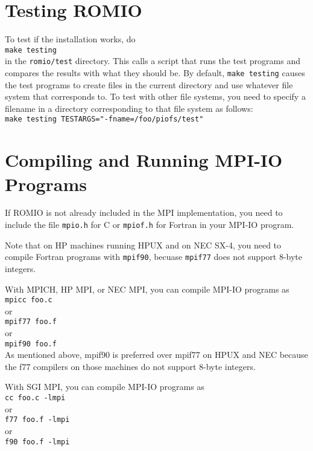 \section{Testing ROMIO}
To test if the installation works, do\\
\hspace*{.4in} {\tt make testing}\\
in the {\tt romio/test} directory. This calls a script that runs the test
programs and compares the results with what they should be. By
default, {\tt make testing} causes the test programs to create files in
the current directory and use whatever file system that corresponds
to. To test with other file systems, you need to specify a filename in
a directory corresponding to that file system as follows:\\
\hspace*{.4in} {\tt make testing TESTARGS="-fname=/foo/piofs/test"}


%
%
\section{Compiling and Running MPI-IO Programs}
If ROMIO is not already included in the MPI implementation, you need
to include the file {\tt mpio.h} for C or {\tt mpiof.h} for Fortran in
your MPI-IO program.  

Note that on HP machines running HPUX and on NEC SX-4, you need to
compile Fortran programs with {\tt mpif90}, becuase {\tt mpif77} does
not support 8-byte integers. 

With MPICH, HP MPI, or NEC MPI, you can compile MPI-IO programs as \\
\hspace*{.4in} {\tt mpicc foo.c}\\
or \\
\hspace*{.4in} {\tt mpif77 foo.f }\\
or\\
\hspace*{.4in} {\tt mpif90 foo.f}\\

As mentioned above, mpif90 is preferred over mpif77 on HPUX and NEC
because the f77 compilers on those machines do not support 8-byte integers.

With SGI MPI, you can compile MPI-IO programs as \\
\hspace*{.4in} {\tt cc foo.c -lmpi}\\
or \\
\hspace*{.4in} {\tt f77 foo.f -lmpi}\\
or \\
\hspace*{.4in} {\tt f90 foo.f -lmpi}\\

